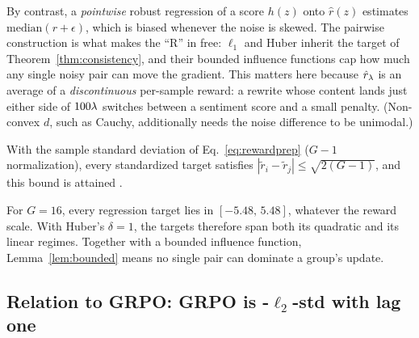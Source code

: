 By contrast, a \emph{pointwise} robust regression of a score $h(z)$ onto
$\hat r(z)$ estimates $\mathrm{median}(r + \epsilon)$, which is biased whenever
the noise is skewed. The pairwise construction is what makes the ``R'' in
\rrebel{} free: $\ell_1$ and Huber inherit the target of
Theorem~\ref{thm:consistency}, and their bounded influence functions
\citep{huber1964robust} cap how much any single noisy pair can move the
gradient. This matters here because $\hat r_\lambda$ is an average of a
\emph{discontinuous} per-sample reward: a rewrite whose content lands just
either side of $100\lambda$ switches between a sentiment score and a small
penalty. (Non-convex $d$, such as Cauchy, additionally needs the noise
difference to be unimodal.)

\begin{lemma}
\label{lem:bounded}
With the sample standard deviation of Eq.~\eqref{eq:rewardprep}
($G-1$ normalization), every standardized target satisfies
$|\tilde r_i - \tilde r_j| \le \sqrt{2(G-1)}$, and this bound is attained
\citep{samuelson1968deviant}.
\end{lemma}

For $G = 16$, every regression target lies in $[-5.48,\, 5.48]$, whatever the
reward scale. With Huber's $\delta = 1$, the targets therefore span both its
quadratic and its linear regimes. Together with a bounded influence function,
Lemma~\ref{lem:bounded} means no single pair can dominate a group's update.

\subsection{Relation to GRPO: GRPO is \rrebel{}-$\ell_2$-std with lag one}
\label{sec:th-grpo}

